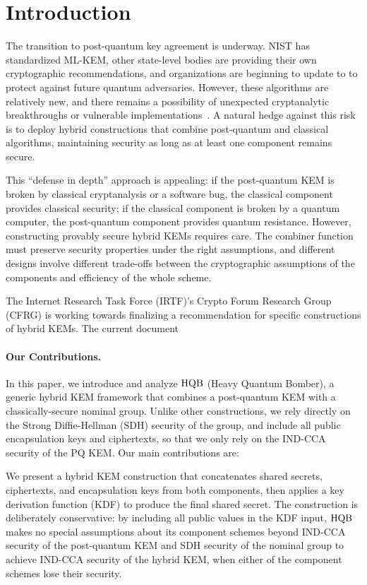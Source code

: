 \section{Introduction}

The transition to post-quantum key agreement is underway. NIST has
standardized ML-KEM, other state-level bodies are providing their own
cryptographic recommendations, and organizations are beginning to update to
to protect against future quantum adversaries. However, these algorithms are
relatively new, and there remains a possibility of unexpected
cryptanalytic breakthroughs or vulnerable implementations~\cite{EC:CasDec23}. A natural hedge
against this risk is to deploy hybrid constructions that combine post-quantum
and classical algorithms, maintaining security as long as at least one
component remains secure.

This ``defense in depth'' approach is appealing: if the post-quantum KEM is
broken by classical cryptanalysis or a software bug, the classical component
provides classical security; if the classical component is broken by a
quantum computer, the post-quantum component provides quantum
resistance. However, constructing provably secure hybrid KEMs requires
care. The combiner function must preserve security properties under the right
assumptions, and different designs involve different trade-offs between the
cryptographic assumptions of the components and efficiency of the whole
scheme.

The Internet Research Task Force (IRTF)'s Crypto Forum Research Group (CFRG) is working towards finalizing a recommendation for specific constructions of hybrid KEMs. The current document~\cite{irtf-cfrg-hybrid-kems-05}

\paragraph{Our Contributions.} In this paper, we introduce and analyze $\text{HQB}$
(Heavy Quantum Bomber), a generic hybrid KEM framework that combines a
post-quantum KEM with a classically-secure nominal group. Unlike other
constructions, we rely directly on the Strong Diffie-Hellman (SDH) security
of the group, and include all public encapsulation keys and ciphertexts, so
that we only rely on the IND-CCA security of the PQ KEM. Our main
contributions are:

We present a hybrid KEM construction that concatenates shared secrets,
ciphertexts, and encapsulation keys from both components, then applies a key
derivation function (KDF) to produce the final shared secret. The
construction is deliberately conservative: by including all public values in
the KDF input, $\text{HQB}$ makes no special assumptions about its component schemes
beyond IND-CCA security of the post-quantum KEM and SDH security of the
nominal group to achieve IND-CCA security of the hybrid KEM, when either of
the component schemes lose their security.

